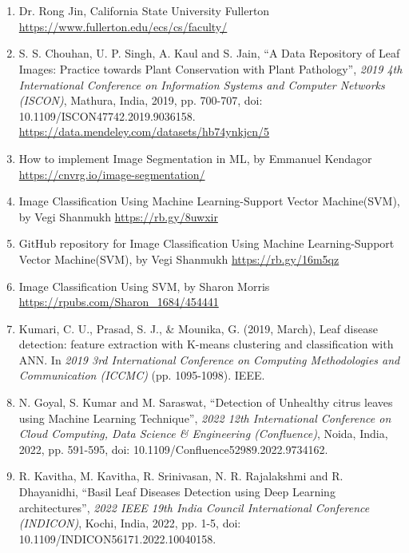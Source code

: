 \documentclass[twocolumn,10pt]{article}
\begin{document}
\begin{multicols}{2}
	
\\~\\
\begin{flushleft}
\begin{enumerate}
	\item Dr. Rong Jin, California State University Fullerton \url{https://www.fullerton.edu/ecs/cs/faculty/}
	\item S. S. Chouhan, U. P. Singh, A. Kaul and S. Jain, \enquote{A Data Repository of Leaf Images: Practice towards Plant Conservation with Plant Pathology}, \textit{2019 4th International Conference on Information Systems and Computer Networks (ISCON)}, Mathura, India, 2019, pp. 700-707, doi: 10.1109/ISCON47742.2019.9036158. \url{https://data.mendeley.com/datasets/hb74ynkjcn/5}
	\item How to implement Image Segmentation in ML, by Emmanuel Kendagor \url{https://cnvrg.io/image-segmentation/}
	\item Image Classification Using Machine Learning-Support Vector Machine(SVM), by Vegi Shanmukh \url{https://rb.gy/8uwxir} %
	\item GitHub repository for Image Classification Using Machine Learning-Support Vector Machine(SVM), by Vegi Shanmukh \url{https://rb.gy/16m5qz} %
	\item Image Classification Using SVM, by Sharon Morris \url{https://rpubs.com/Sharon_1684/454441}
	\item Kumari, C. U., Prasad, S. J., \& Mounika, G. (2019, March), Leaf disease detection: feature extraction with K-means clustering and classification with ANN. In \textit{2019 3rd International Conference on Computing Methodologies and Communication (ICCMC)} (pp. 1095-1098). IEEE.
	\item N. Goyal, S. Kumar and M. Saraswat, \enquote{Detection of Unhealthy citrus leaves using Machine Learning Technique}, \textit{2022 12th International Conference on Cloud Computing, Data Science \& Engineering (Confluence)}, Noida, India, 2022, pp. 591-595, doi: 10.1109/Confluence52989.2022.9734162.
	\item R. Kavitha, M. Kavitha, R. Srinivasan, N. R. Rajalakshmi and R. Dhayanidhi, \enquote{Basil Leaf Diseases Detection using Deep Learning architectures}, \textit{2022 IEEE 19th India Council International Conference (INDICON)}, Kochi, India, 2022, pp. 1-5, doi: 10.1109/INDICON56171.2022.10040158.

\end{enumerate}
\end{flushleft}
\end{multicols}
\end{document}
